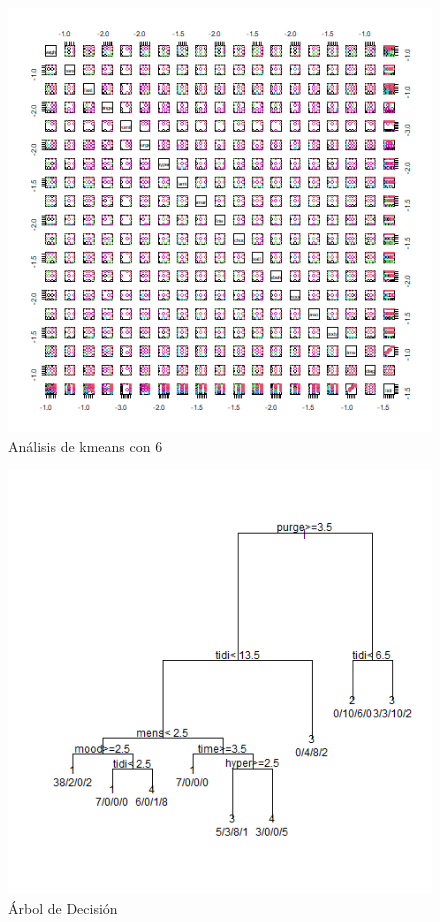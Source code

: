 \documentclass[a4paper,10pt,twocolumn]{article}
\begin{document}
	\begin{figure}[htb]%
		\begin{center}
			\includegraphics[width=\linewidth]{kmeans_cluster_6}
		\end{center}
		\caption{Análisis de kmeans con 6 \label{fig:kmeans_cluster_6}}%
	\end{figure}
	
	\begin{figure}[htb]%
		\begin{center}
			\includegraphics[width=\linewidth]{d_tree_cluster_diag_class_8}
		\end{center}
		\caption{Árbol de Decisión \label{fig:d_tree_cluster_diag_class_8}}%
	\end{figure}
	
	
	\label{end}
	
\end{document}
